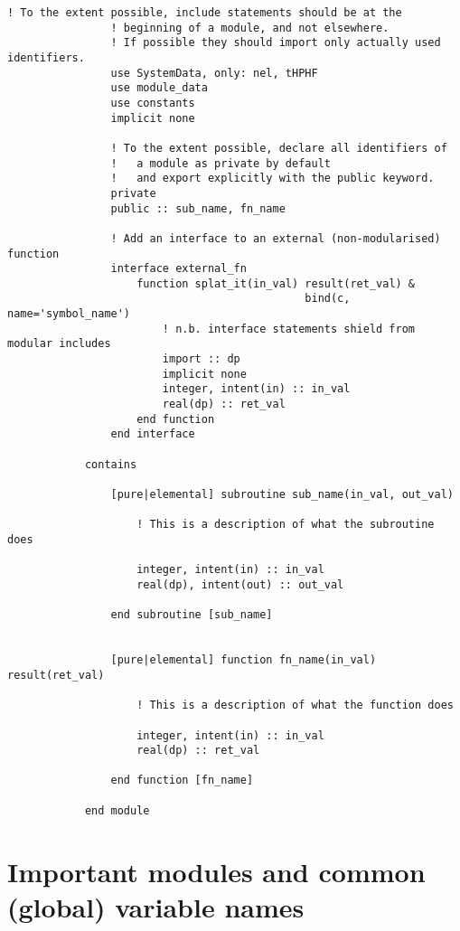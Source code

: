 \documentclass[a4paper,notitlepage]{scrreprt}
\begin{document}
\begin{description}
\begin{lstlisting}[gobble=12]
            	! To the extent possible, include statements should be at the
                ! beginning of a module, and not elsewhere.
                ! If possible they should import only actually used identifiers.
            	use SystemData, only: nel, tHPHF
            	use module_data
            	use constants
            	implicit none

                ! To the extent possible, declare all identifiers of
                !   a module as private by default
                !   and export explicitly with the public keyword.
                private
                public :: sub_name, fn_name

                ! Add an interface to an external (non-modularised) function
            	interface external_fn
            	    function splat_it(in_val) result(ret_val) &
											  bind(c, name='symbol_name')
            		    ! n.b. interface statements shield from modular includes
            			import :: dp
            			implicit none
            			integer, intent(in) :: in_val
            			real(dp) :: ret_val
            		end function
            	end interface

            contains

            	[pure|elemental] subroutine sub_name(in_val, out_val)

            		! This is a description of what the subroutine does

            		integer, intent(in) :: in_val
            		real(dp), intent(out) :: out_val

            	end subroutine [sub_name]


            	[pure|elemental] function fn_name(in_val) result(ret_val)

            		! This is a description of what the function does

            		integer, intent(in) :: in_val
            		real(dp) :: ret_val

            	end function [fn_name]

            end module
		\end{lstlisting}

\end{description}

\section{Important modules and common (global) variable names}
\label{sect:cons-types}
\end{document}
